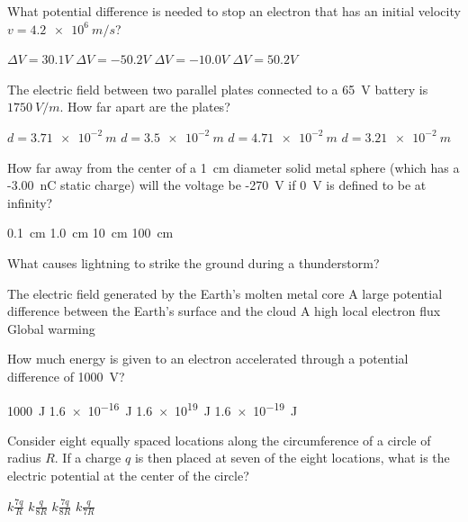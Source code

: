 \question What potential difference is needed to stop an electron that has an initial velocity $v=\SI{4.2e6}{m/s}$?
\begin{checkboxes}
\choice $\Delta V = 30.1 V$
\CorrectChoice $\Delta V = -50.2 V$ \correct
\choice $\Delta V = -10.0 V$
\choice $\Delta V = 50.2 V$
\end{checkboxes}

\question The electric field between two parallel plates connected to a \SI{65}{V} battery is $\SI{1750}{V/m}$. How far apart are the plates? 
\begin{checkboxes}
\CorrectChoice $d = \SI{3.71e-2}{m}$ \correct %
\choice $d = \SI{3.5e-2}{m}$
\choice $d = \SI{4.71e-2}{m}$
\choice $d = \SI{3.21e-2}{m}$
\end{checkboxes}


\question How far away from the center of a \SI{1}{cm} diameter solid metal sphere (which has a -\SI{3.00}{nC} static charge) will the voltage be -\SI{270}{V} if \SI{0}{V} is defined to be at infinity? 
\begin{checkboxes}
\choice \SI{0.1}{cm}
\choice \SI{1.0}{cm}
\CorrectChoice \SI{10}{cm} \correct
\choice \SI{100}{cm}
\end{checkboxes}

\question What causes lightning to strike the ground during a thunderstorm?
\begin{checkboxes}
\choice The electric field generated by the Earth's molten metal core
\CorrectChoice A large potential difference between the Earth's surface and the cloud \correct
\choice A high local electron flux
\choice Global warming
\end{checkboxes}

\question How much energy is given to an electron accelerated through a potential difference of \SI{1000}{V}?
\begin{checkboxes}
\choice \SI{1000}{J}
\CorrectChoice \SI{1.6e-16}{J} \correct
\choice \SI{1.6e19}{J}
\choice \SI{1.6e-19}{J}
\end{checkboxes}


\question Consider eight equally spaced locations along the circumference of a circle of radius $R$. If a charge $q$ is then placed at seven of the eight locations, what is the electric potential at the center of the circle?
\begin{checkboxes}
\CorrectChoice $ k \frac{7q}{R}$ \correct
\choice $ k \frac{q}{8 R}$
\choice $ k \frac{7q}{8 R}$
\choice $ k \frac{q}{7 R}$
\end{checkboxes}

